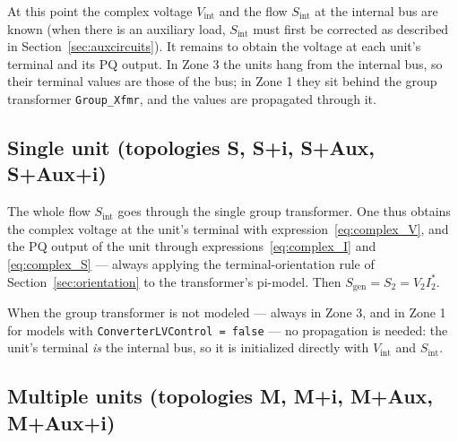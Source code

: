 \documentclass[a4paper,11pt]{article}
\newcommand{\code}[1]{\texttt{#1}}  %
\newcommand{\Sgen}{\ensuremath{S_{\textrm{gen}}}}
\begin{document}
At this point the complex voltage $V_{\textrm{int}}$ and the flow $S_{\textrm{int}}$ at
the internal bus are known (when there is an auxiliary load, $S_{\textrm{int}}$ must
first be corrected as described in Section~\ref{sec:auxcircuits}). It remains to obtain
the voltage at each unit's terminal and its PQ output. In Zone 3 the units hang from the
internal bus, so their terminal values are those of the bus; in Zone 1 they sit behind
the group transformer \code{Group\_Xfmr}, and the values are propagated through it.

\subsection{Single unit (topologies S, S+i, S+Aux, S+Aux+i)}

The whole flow $S_{\textrm{int}}$ goes through the single group transformer. One thus
obtains the complex voltage at the unit's terminal with
expression~\eqref{eq:complex_V}, and the PQ output of the unit through
expressions~\eqref{eq:complex_I} and \eqref{eq:complex_S} --- always applying the
terminal-orientation rule of Section~\ref{sec:orientation} to the transformer's
pi-model. Then $\Sgen = S_2 = V_2 I_2^*$.

When the group transformer is not modeled --- always in Zone 3, and in Zone 1 for models
with \code{ConverterLVControl = false} --- no propagation is needed: the unit's terminal
\emph{is} the internal bus, so it is initialized directly with $V_{\textrm{int}}$ and
$S_{\textrm{int}}$.

\subsection{Multiple units (topologies M, M+i, M+Aux, M+Aux+i)}
\end{document}
